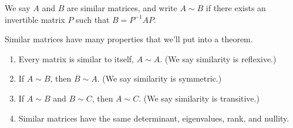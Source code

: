 \begin{definition}
We say $A$ and $B$ are similar matrices, and write $A\sim B$ if there exists an invertible matrix $P$ such that $B=P^{-1}AP$.
\end{definition}

Similar matrices have many properties that we'll put into a theorem. 

\begin{theorem}
\begin{enumerate}
	\item Every matrix is similar to itself, $A\sim A$. (We say similarity is reflexive.)
	\item If $A\sim B$, then $B\sim A$. (We say similarity is symmetric.)
	\item If $A\sim B$ and $B\sim C$, then $A\sim C$. (We say similarity is transitive.)
	\item Similar matrices have the same determinant, eigenvalues, rank, and nullity.
\end{enumerate}
\end{theorem}
